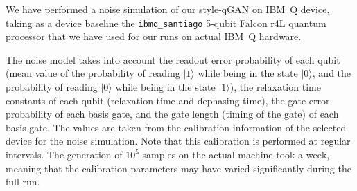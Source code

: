\documentclass[twocolumn,preprintnumbers,superscriptaddress]{revtex4-2}
\begin{document}
We have performed a noise simulation of our style-qGAN on IBM~Q device, taking as a device baseline the {\tt ibmq\_santiago}
5-qubit Falcon r4L quantum processor that we have used for our runs on actual IBM~Q hardware.

The noise model takes into account the readout error probability of each qubit (mean value of the probability of reading $|1\rangle$ while being in the state $|0\rangle$, and the probability of reading $|0\rangle$ while being in the state $|1\rangle$), the relaxation time constants of each qubit (relaxation time and dephasing time), the gate error probability of each basis gate, and the gate length (timing of the gate) of each basis gate. The values are taken from the calibration information of the selected device for the noise simulation. Note that this calibration is performed at regular intervals. The generation of $10^5$ samples on the actual machine took a week, meaning that the calibration parameters may have varied significantly
during the full run.
\end{document}
